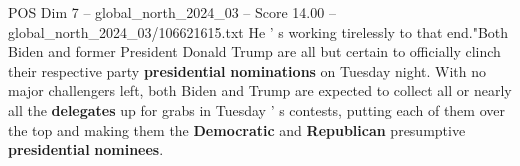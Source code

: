 \begin{textsample}{POS Dim 7 – global\_north\_2024\_03 – Score 14.00 – global\_north\_2024\_03/106621615.txt}
He ' s working tirelessly to that end."Both Biden and former President Donald Trump are all but certain to officially clinch their respective party \textbf{presidential} \textbf{nominations} on Tuesday night.
With no major challengers left, both Biden and Trump are expected to collect all or nearly all the \textbf{delegates} up for grabs in Tuesday ' s contests, putting each of them over the top and making them the \textbf{Democratic} and \textbf{Republican} presumptive \textbf{presidential} \textbf{nominees}.

\end{textsample}
